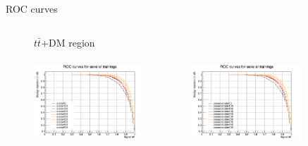 \documentclass[8pt]{beamer}
\begin{document}
\begin{frame}{ROC curves}
\begin{figure}[htbp]
\begin{columns}
\begin{column}{1.09\textwidth}
\begin{block}{\centering $t \bar t$+DM region}\end{block} \vspace{10pt}
\end{column}
\end{columns} \vspace{-16pt}

\begin{columns}
\begin{column}[b]{.49\textwidth}
\begin{center}
\includegraphics[width=4.2cm, height=3.2cm]{figs/groupedROC_scalar_TTbar.png}
\end{center}
\end{column} \hfill
\begin{column}[b]{.49\textwidth}
\begin{center}
\includegraphics[width=4.2cm, height=3.2cm]{figs/groupedROC_pseudo_TTbar.png}
\end{center}
\end{column} \hfill
\end{columns} \vfill
\label{fig:ROC2}
\end{figure}
\end{frame}


\end{document}
